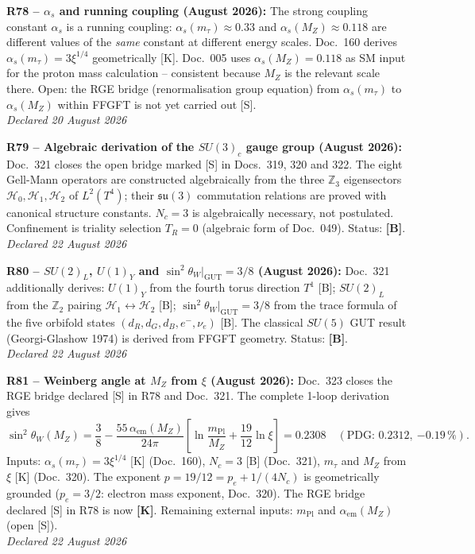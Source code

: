 \medskip
\textbf{R78 -- $\alpha_s$ and running coupling (August 2026):} The strong coupling constant $\alpha_s$ is a running coupling: $\alpha_s(m_\tau) \approx 0.33$ and $\alpha_s(M_Z) \approx 0.118$ are different values of the \emph{same} constant at different energy scales. Doc.~160 derives $\alpha_s(m_\tau) = 3\xi^{1/4}$ geometrically [K]. Doc.~005 uses $\alpha_s(M_Z) = 0.118$ as SM input for the proton mass calculation -- consistent because $M_Z$ is the relevant scale there. Open: the RGE bridge (renormalisation group equation) from $\alpha_s(m_\tau)$ to $\alpha_s(M_Z)$ within FFGFT is not yet carried out [S].\\
\emph{Declared 20 August 2026}

\medskip

\medskip
\textbf{R79 -- Algebraic derivation of the $SU(3)_c$ gauge group (August 2026):} Doc.~321 closes the open bridge marked [S] in Docs.~319, 320 and 322. The eight Gell-Mann operators are constructed algebraically from the three $\mathbb{Z}_3$ eigensectors $\mathcal{H}_0, \mathcal{H}_1, \mathcal{H}_2$ of $L^2(T^4)$; their $\mathfrak{su}(3)$ commutation relations are proved with canonical structure constants. $N_c = 3$ is algebraically necessary, not postulated. Confinement is triality selection $T_R = 0$ (algebraic form of Doc.~049). Status: \textbf{[B]}.\\
\emph{Declared 22 August 2026}

\medskip
\textbf{R80 -- $SU(2)_L$, $U(1)_Y$ and $\sin^2\theta_W|_{\mathrm{GUT}} = 3/8$ (August 2026):} Doc.~321 additionally derives: $U(1)_Y$ from the fourth torus direction $T^1$ [B]; $SU(2)_L$ from the $\mathbb{Z}_2$ pairing $\mathcal{H}_1\leftrightarrow\mathcal{H}_2$ [B]; $\sin^2\theta_W|_{\mathrm{GUT}} = 3/8$ from the trace formula of the five orbifold states $(d_R,d_G,d_B,e^-,\nu_e)$ [B]. The classical $SU(5)$ GUT result (Georgi-Glashow 1974) is derived from FFGFT geometry. Status: \textbf{[B]}.\\
\emph{Declared 22 August 2026}

\medskip
\textbf{R81 -- Weinberg angle at $M_Z$ from $\xi$ (August 2026):} Doc.~323 closes the RGE bridge declared [S] in R78 and Doc.~321. The complete 1-loop derivation gives
\[
  \sin^2\theta_W(M_Z) = \frac{3}{8}
  - \frac{55\,\alpha_{\mathrm{em}}(M_Z)}{24\pi}
    \!\left[\ln\!\frac{m_{\mathrm{Pl}}}{M_Z}
           + \frac{19}{12}\ln\xi\right]
  = 0.2308
  \quad(\text{PDG: }0.2312{,}\ {-0.19\,\%}).
\]
Inputs: $\alpha_s(m_\tau)=3\xi^{1/4}$ [K] (Doc.~160), $N_c=3$ [B] (Doc.~321), $m_\tau$ and $M_Z$ from $\xi$ [K] (Doc.~320). The exponent $p=19/12 = p_e + 1/(4N_c)$ is geometrically grounded ($p_e=3/2$: electron mass exponent, Doc.~320). The RGE bridge declared [S] in R78 is now \textbf{[K]}. Remaining external inputs: $m_{\mathrm{Pl}}$ and $\alpha_{\mathrm{em}}(M_Z)$ (open [S]).\\
\emph{Declared 22 August 2026}

